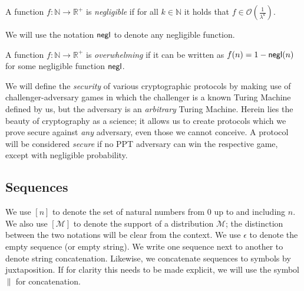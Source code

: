\begin{definition}[Negligible]
  A function $f: \mathbb{N} \longrightarrow \mathbb{R}^+$ is
  \emph{negligible} if for all $k \in \mathbb{N}$ it holds that
  $f \in \mathcal{O}(\frac{1}{\lambda^k})$.
\end{definition}

We will use the notation $\mathsf{negl}$ to denote any negligible function.

\begin{definition}[Overwhelming]
  A function $f: \mathbb{N} \longrightarrow \mathbb{R}^+$ is
  \emph{overwhelming} if it can be written as $f(n) = 1 - \mathsf{negl}(n)$ for
  some negligible function $\mathsf{negl}$.
\end{definition}

We will define the \emph{security} of various cryptographic protocols by making use of challenger-adversary games in which the challenger is a known Turing Machine defined by us, but the adversary is an \emph{arbitrary} Turing Machine. Herein lies the beauty of cryptography as a science; it allows us to create protocols which we prove secure against \emph{any} adversary, even those we cannot conceive. A protocol will be considered \emph{secure} if no PPT adversary can win the respective game, except with negligible probability.

\subsection{Sequences}
We use $[n]$ to denote the set of natural numbers from $0$ up to and including
$n$. We also use $[\mathcal{M}]$ to denote the support of a distribution
$\mathcal{M}$; the distinction between the two notations will be clear from the
context.
We use $\epsilon$ to denote the empty sequence (or empty string). We write
one sequence next to another to denote string concatenation. Likewise, we
concatenate sequences to symbols by juxtaposition. If for clarity this needs to
be made explicit, we will use the symbol $\,\|\,$ for concatenation.

